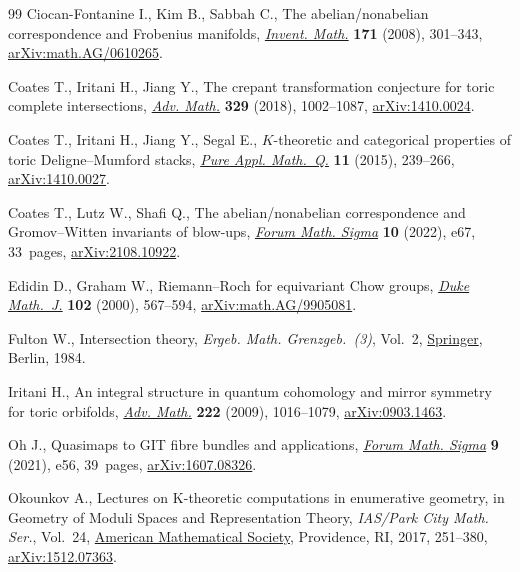 \documentclass[11pt]{article}
\numberwithin{equation}{section}
\numberwithin{equation}{section}
\begin{document}
\begin{thebibliography}{99}
Ciocan-Fontanine I., Kim B., Sabbah C., The abelian/nonabelian correspondence
 and {F}robenius manifolds, \href{https://doi.org/10.1007/s00222-007-0082-x}{\textit{Invent. Math.}} \textbf{171} (2008),
 301--343, \href{https://arxiv.org/abs/math.AG/0610265}{arXiv:math.AG/0610265}.

Coates T., Iritani H., Jiang Y., The crepant transformation conjecture for
 toric complete intersections, \href{https://doi.org/10.1016/j.aim.2017.11.017}{\textit{Adv. Math.}} \textbf{329} (2018),
 1002--1087, \href{https://arxiv.org/abs/1410.0024}{arXiv:1410.0024}.

Coates T., Iritani H., Jiang Y., Segal E., {$K$}-theoretic and categorical
 properties of toric {D}eligne--{M}umford stacks, \href{https://doi.org/10.4310/PAMQ.2015.v11.n2.a3}{\textit{Pure Appl. Math.~Q.}}
 \textbf{11} (2015), 239--266, \href{https://arxiv.org/abs/1410.0027}{arXiv:1410.0027}.

Coates T., Lutz W., Shafi Q., The abelian/nonabelian correspondence and
 {G}romov--{W}itten invariants of blow-ups, \href{https://doi.org/10.1017/fms.2022.46}{\textit{Forum Math. Sigma}}
 \textbf{10} (2022), e67, 33~pages, \href{https://arxiv.org/abs/2108.10922}{arXiv:2108.10922}.

Edidin D., Graham W., Riemann--{R}och for equivariant {C}how groups,
 \href{https://doi.org/10.1215/S0012-7094-00-10239-6}{\textit{Duke Math.~J.}} \textbf{102} (2000), 567--594,
 \href{https://arxiv.org/abs/math.AG/9905081}{arXiv:math.AG/9905081}.

Fulton W., Intersection theory, \textit{Ergeb. Math. Grenzgeb.~(3)}, Vol.~2,
 \href{https://doi.org/10.1007/978-3-662-02421-8}{Springer}, Berlin, 1984.

Iritani H., An integral structure in quantum cohomology and mirror symmetry for
 toric orbifolds, \href{https://doi.org/10.1016/j.aim.2009.05.016}{\textit{Adv. Math.}} \textbf{222} (2009), 1016--1079,
 \href{https://arxiv.org/abs/0903.1463}{arXiv:0903.1463}.

Oh J., Quasimaps to {GIT} fibre bundles and applications, \href{https://doi.org/10.1017/fms.2021.48}{\textit{Forum Math.
 Sigma}} \textbf{9} (2021), e56, 39~pages, \href{https://arxiv.org/abs/1607.08326}{arXiv:1607.08326}.

Okounkov A., Lectures on {K}-theoretic computations in enumerative geometry, in
 Geometry of Moduli Spaces and Representation Theory, \textit{IAS/Park City
 Math. Ser.}, Vol.~24, \href{https://doi.org/10.1090/pcms/024}{American Mathematical Society}, Providence, RI, 2017,
 251--380, \href{https://arxiv.org/abs/1512.07363}{arXiv:1512.07363}.


\end{thebibliography}
\end{document}
